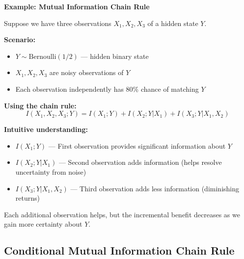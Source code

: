 \documentclass[11pt,a4paper]{book}
\newcounter{qna}[chapter]
\renewcommand{\theqna}{\thechapter.\arabic{qna}}
\newenvironment{questionanswerbox}{
    \refstepcounter{qna}%
    \begin{tcolorbox}[
        enhanced,
        breakable,
        colback=softlavender!10,
        colframe=softlavender!200,
        title={Example~\theqna}, %
        fonttitle=\bfseries,
        coltitle=white,
        colbacktitle=softlavender!200,
        sharp corners,
        boxrule=1pt,
        left=8pt,
        right=8pt,
        top=6pt,
        bottom=6pt
    ]
}{
    \end{tcolorbox}
}
\begin{document}
\begin{questionanswerbox}
    \textbf{Example: Mutual Information Chain Rule}
    
    Suppose we have three observations \(X_1, X_2, X_3\) of a hidden state \(Y\).
    
    \textbf{Scenario:}
    \begin{itemize}
        \item \(Y \sim \text{Bernoulli}(1/2)\) — hidden binary state
        \item \(X_1, X_2, X_3\) are noisy observations of \(Y\)
        \item Each observation independently has 80\% chance of matching \(Y\)
    \end{itemize}
    
    \textbf{Using the chain rule:}
    \[
    I(X_1, X_2, X_3; Y) = I(X_1; Y) + I(X_2; Y | X_1) + I(X_3; Y | X_1, X_2)
    \]
    
    \textbf{Intuitive understanding:}
    \begin{itemize}
        \item \(I(X_1; Y)\) — First observation provides significant information about \(Y\)
        \item \(I(X_2; Y | X_1)\) — Second observation adds information (helps resolve uncertainty from noise)
        \item \(I(X_3; Y | X_1, X_2)\) — Third observation adds less information (diminishing returns)
    \end{itemize}
    
    Each additional observation helps, but the incremental benefit decreases as we gain more certainty about \(Y\).
\end{questionanswerbox}

\subsection{Conditional Mutual Information Chain Rule}
\end{document}
